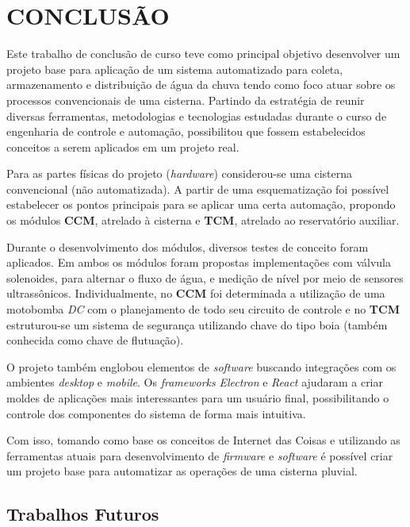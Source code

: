 
\chapter{CONCLUSÃO}
\label{chap:conclusao}

Este trabalho de conclusão de curso teve como principal objetivo desenvolver um projeto base para aplicação de um sistema automatizado para coleta, armazenamento e distribuição de água da chuva tendo como foco atuar sobre os processos convencionais de uma cisterna. Partindo da estratégia de reunir diversas ferramentas, metodologias e tecnologias estudadas durante o curso de engenharia de controle e automação, possibilitou que fossem estabelecidos conceitos a serem aplicados em um projeto real.

Para as partes físicas do projeto (\textit{hardware}) considerou-se uma cisterna convencional (não automatizada). A partir de uma esquematização foi possível estabelecer os pontos principais para se aplicar uma certa automação, propondo os módulos \textbf{CCM}, atrelado à cisterna e \textbf{TCM}, atrelado ao reservatório auxiliar.

Durante o desenvolvimento dos módulos, diversos testes de conceito foram aplicados. Em ambos os módulos foram propostas implementações com válvula solenoides, para alternar o fluxo de água, e medição de nível por meio de sensores ultrassônicos. Individualmente, no \textbf{CCM} foi determinada a utilização de uma motobomba \textit{DC} com o planejamento de todo seu circuito de controle e no \textbf{TCM} estruturou-se um sistema de segurança utilizando chave do tipo boia (também conhecida como chave de flutuação).

O projeto também englobou elementos de \textit{software} buscando integrações com os ambientes \textit{desktop} e \textit{mobile}. Os \textit{frameworks} \textit{Electron} e \textit{React} ajudaram a criar moldes de aplicações mais interessantes para um usuário final, possibilitando o controle dos componentes do sistema de forma mais intuitiva.

Com isso, tomando como base os conceitos de Internet das Coisas e utilizando as ferramentas atuais para desenvolvimento de \textit{firmware} e \textit{software} é possível criar um projeto base para automatizar as operações de uma cisterna pluvial.

\section{Trabalhos Futuros}
\label{sec:trabalhosFuturos}

